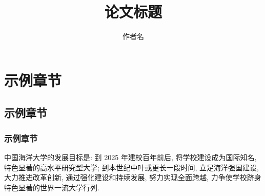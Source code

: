 \documentclass[cn]{oucart}
\title{论文标题}
\author{作者名}
\begin{document}
\makecover

\makeabstract

\tableofcontents

\newpage

\section{示例章节}
\subsection{示例章节}
\subsubsection{示例章节}
中国海洋大学的发展目标是: 到 2025 年建校百年前后, 将学校建设成为国际知名, 特色显著的高水平研究型大学; 到本世纪中叶或更长一段时间, 立足海洋强国建设, 大力推进改革创新, 通过强化建设和持续发展, 努力实现全面跨越, 力争使学校跻身特色显著的世界一流大学行列\cite{wiki:ouc}. 

\newpage



\end{document}
